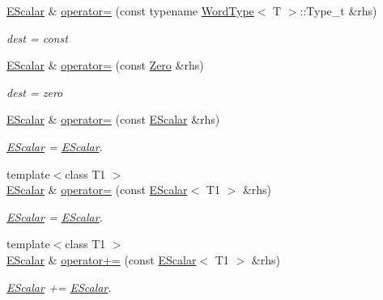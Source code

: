\begin{DoxyCompactItemize}
\mbox{\hyperlink{classENSEM_1_1EScalar}{E\+Scalar}} \& \mbox{\hyperlink{classENSEM_1_1EScalar_a01ae8ddc1b0d0e4ecd65f5de624faee5}{operator=}} (const typename \mbox{\hyperlink{structENSEM_1_1WordType}{Word\+Type}}$<$ T $>$\+::Type\+\_\+t \&rhs)
\begin{DoxyCompactList}\small\item\em dest = const \end{DoxyCompactList}\item 
\mbox{\hyperlink{classENSEM_1_1EScalar}{E\+Scalar}} \& \mbox{\hyperlink{classENSEM_1_1EScalar_a9619fd24baf50fd03986c3056a484cb9}{operator=}} (const \mbox{\hyperlink{structENSEM_1_1Zero}{Zero}} \&rhs)
\begin{DoxyCompactList}\small\item\em dest = zero \end{DoxyCompactList}\item 
\mbox{\hyperlink{classENSEM_1_1EScalar}{E\+Scalar}} \& \mbox{\hyperlink{classENSEM_1_1EScalar_ade0daedd37868c24651613bb6f499fd4}{operator=}} (const \mbox{\hyperlink{classENSEM_1_1EScalar}{E\+Scalar}} \&rhs)
\begin{DoxyCompactList}\small\item\em \mbox{\hyperlink{classENSEM_1_1EScalar}{E\+Scalar}} = \mbox{\hyperlink{classENSEM_1_1EScalar}{E\+Scalar}}. \end{DoxyCompactList}\item 
{\footnotesize template$<$class T1 $>$ }\\\mbox{\hyperlink{classENSEM_1_1EScalar}{E\+Scalar}} \& \mbox{\hyperlink{classENSEM_1_1EScalar_a8ec804b8b082a748bb364fbb4a511757}{operator=}} (const \mbox{\hyperlink{classENSEM_1_1EScalar}{E\+Scalar}}$<$ T1 $>$ \&rhs)
\begin{DoxyCompactList}\small\item\em \mbox{\hyperlink{classENSEM_1_1EScalar}{E\+Scalar}} = \mbox{\hyperlink{classENSEM_1_1EScalar}{E\+Scalar}}. \end{DoxyCompactList}\item 
{\footnotesize template$<$class T1 $>$ }\\\mbox{\hyperlink{classENSEM_1_1EScalar}{E\+Scalar}} \& \mbox{\hyperlink{classENSEM_1_1EScalar_aa34f8bd686adb144a6d0e5e8f69787ce}{operator+=}} (const \mbox{\hyperlink{classENSEM_1_1EScalar}{E\+Scalar}}$<$ T1 $>$ \&rhs)
\begin{DoxyCompactList}\small\item\em \mbox{\hyperlink{classENSEM_1_1EScalar}{E\+Scalar}} += \mbox{\hyperlink{classENSEM_1_1EScalar}{E\+Scalar}}. \end{DoxyCompactList}\item 

\end{DoxyCompactItemize}
